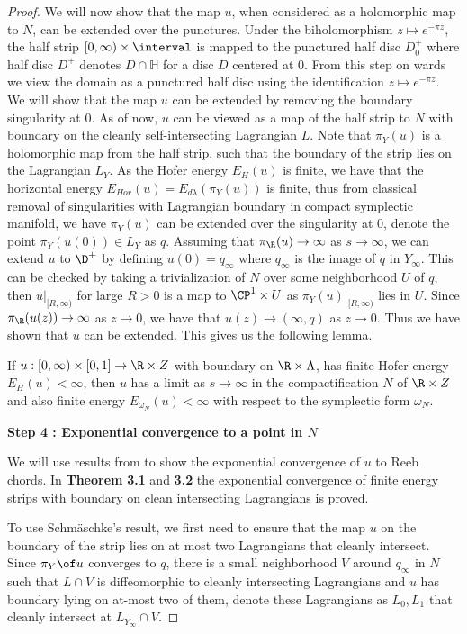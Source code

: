 \begin{proof}
We will now show that the map $u$, when considered as a holomorphic map to $N$, can be extended over the punctures. Under the biholomorphism $z \mapsto e^{-\pi z}$, the half strip $[0,\infty) \times \interval  $ is mapped to the punctured half disc $D^+_0$ where half disc $D^+$ denotes $D\cap \mathbb{H}$ for a disc $D $ centered at $0$.  From this step on wards we view the domain as a punctured half disc using the identification $z \mapsto e^{-\pi z}$. We will show that the map $u$ can be extended by removing the boundary singularity at $0$. As of now, $u$ can be viewed as a map of the half strip to $N$ with boundary on the cleanly self-intersecting Lagrangian $L$. Note that $\pi_Y(u)$ is a holomorphic map from the half strip, such that the boundary of the strip lies on the Lagrangian $L_Y$. As the Hofer energy $E_H(u)$ is finite, we have that the horizontal energy $E_{Hor}(u)= E_{d\lambda} (\pi_Y (u))$ is finite, thus from classical removal of singularities with Lagrangian boundary in compact symplectic manifold, we have $\pi_Y(u)$ can be extended over the singularity at $0$, denote the point $\pi_Y(u(0)) \in L_Y$ as $q$. Assuming that $\pi_\R (u) \to \infty$ as $s\to \infty$, we can extend $u$ to $\D^+$ by defining $u(0) = q_\infty$ where $q_\infty$ is the image of $q$ in $Y_\infty$. This can be checked by taking a trivialization of $N$ over some neighborhood $U$ of $q$, then $u|_{[R,\infty)}$ for large $R>0$ is a map to $\CP^1 \times U$ as $\pi_Y(u)|_{[R,\infty)}$ lies in $U$. Since $\pi_\R (u(z)) \to \infty$ as $z\to 0$, we have that $u(z) \to (\infty,q)$ as $z \to 0$. Thus we have shown that $u$ can be extended. This gives us the following lemma.

\begin{lemma}
If $u:[0,\infty) \times [0,1] \to \R \times Z$ with boundary on $\R \times \Lambda$, has finite Hofer energy $E_H(u) < \infty$, then $u$ has a limit as $s \to \infty$  in the compactification $N$ of $\R \times Z$ and also finite energy $E_{\omega_N} (u) < \infty$ with respect to the symplectic form $\omega_N$.
\end{lemma}

\textbf{Step 4 : Exponential convergence to a point in $N$}

We will use results from \cite{schm} to show the exponential convergence of $u$ to Reeb chords. In \textbf{Theorem} \textbf{3.1 } and \textbf{3.2} the exponential convergence of finite energy strips with boundary on clean intersecting Lagrangians is proved. 

To use Schm\"aschke's result, we first need to ensure that the map $u$ on the boundary of the strip lies on at most two Lagrangians that cleanly intersect. Since $\pi_Y \of u $ converges to $q$, there is a small neighborhood $V$ around $q_\infty$ in $N$ such that $L \cap V$ is diffeomorphic to cleanly intersecting Lagrangians and $u$ has boundary lying on at-most two of them, denote these Lagrangians as $L_0,L_1$ that cleanly intersect at $L_{Y_\infty} \cap V$.


\end{proof}
